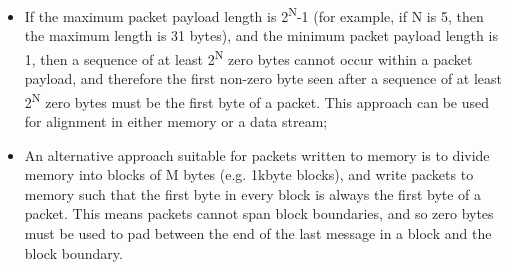\begin{itemize}
  \item If the maximum packet payload length is 2\textsuperscript{N}-1 (for example, if N is 5, then the maximum length is
    31 bytes), and the minimum packet payload length is 1, then a sequence of at least 2\textsuperscript{N} zero 
    bytes cannot occur within a packet payload, and therefore the first non-zero byte seen after a sequence of 
    at least 2\textsuperscript{N} zero bytes must be the first byte of a packet.  This approach can be used for
    alignment in either memory or a data stream;
  \item An alternative approach suitable for packets written to memory is to divide memory into blocks of M bytes
    (e.g. 1kbyte blocks), and write packets to memory such that the first byte in every block is always the first
    byte of a packet.  This means packets cannot span block boundaries, and so zero bytes must be used to pad between 
    the end of the last message in a block and the block boundary.
\end{itemize}

